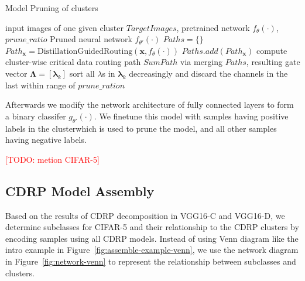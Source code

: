 \documentclass[sigplan,10pt,review]{acmart}\settopmatter{printfolios=true,printccs=false,printacmref=false}
\newcommand{\todo}[1]{\textcolor{red}{[TODO: #1]}}
\begin{document}
\begin{algorithm}
	\caption{Model Pruning of clusters}
	\label{alg:prune}
	\begin{algorithmic}[1]
		\Require input images of one given cluster $TargetImages$, pretrained network $f_\theta(\cdot)$, $prune\_ratio$
		\Ensure Pruned neural network $f_{\theta'}(\cdot)$
		\State $Paths = \{\}$
			\State $Path_{\boldsymbol{x}} = \mathrm{DistillationGuidedRouting}(\boldsymbol{x}, f_\theta(\cdot))$
			\State $Paths.add(Path_{\boldsymbol{x}})$
		\EndFor		
		\State compute cluster-wise critical data routing path $SumPath$ via merging $Paths$, resulting gate vector $\boldsymbol{\Lambda} = [\boldsymbol{\lambda}_k]$
			\State sort all $\lambda$s in $\boldsymbol{\lambda}_k$ decreasingly and discard the channels in the last within range of $prune\_ration$
		\EndFor
	\end{algorithmic}
\end{algorithm}

Afterwards we modify the network architecture of fully connected layers to form a binary classifer $g_{\theta'}(\cdot)$. We finetune this model with samples having positive labels in the clusterwhich is used to prune the model, and all other samples having negative labels.


\todo{metion CIFAR-5}
\subsection{CDRP Model Assembly}
Based on the results of CDRP decomposition in VGG16-C and VGG16-D, we determine subclasses for CIFAR-5 and their relationship to the CDRP clusters by encoding samples using all CDRP models.
Instead of using Venn diagram like the intro example in Figure~\ref{fig:assemble-example-venn}, we use the network diagram in Figure~\ref{fig:network-venn} to represent the relationship between subclasses and clusters.
\end{document}
